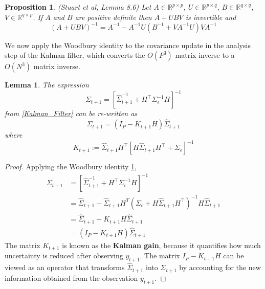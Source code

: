 \documentclass[12pt]{article}
\newcommand{\R}{\mathbb{R}}
\newtheorem{prop}{Proposition}
\newtheorem{lemma}{Lemma}
\begin{document}
\begin{prop} (Stuart et al, Lemma 8.6) \label{Woodbury}
Let $A \in \R^{p \times p}$, $U \in \R^{p \times q}$, $B \in \R^{q \times q}$, $V \in \R^{q \times p}$. If $A$ and $B$ are positive definite then $A + UBV$ is invertible 
and 
\[(A + UBV)^{-1} = A^{-1} - A^{-1} U\left(B^{-1} + VA^{-1}U\right)VA^{-1}\]
\end{prop}

We now apply the Woodbury identity to the covariance update in the analysis step of the Kalman filter, which converts the $O(P^3)$ matrix inverse to a $O(N^3)$ 
matrix inverse. 

\begin{lemma} 
The expression 
\[\Sigma_{t + 1} = \left[\hat{\Sigma}^{-1}_{t + 1} + H^\top \Sigma_{\epsilon}^{-1} H \right]^{-1}\]
from \ref{Kalman_Filter} can be re-written as 
\[\Sigma_{t + 1} = \left(I_P - K_{t+1}H \right)\hat{\Sigma}_{t+1}\]
where 
\[K_{t+1} := \hat{\Sigma}_{t+1} H^{\top} \left[H\hat{\Sigma}_{t+1} H^\top + \Sigma_{\epsilon} \right]^{-1} \]
\end{lemma}

\begin{proof}
Applying the Woodbury identity \ref{Woodbury}, 
\begin{align*}
\Sigma_{t + 1} &= \left[\hat{\Sigma}^{-1}_{t + 1} + H^\top \Sigma_{\epsilon}^{-1} H \right]^{-1} \\
		       &= \hat{\Sigma}_{t + 1} - \hat{\Sigma}_{t + 1} H^T \left(\Sigma_{\epsilon} + H\hat{\Sigma}_{t + 1}H^\top \right)^{-1} H \hat{\Sigma}_{t + 1} \\
		       &= \hat{\Sigma}_{t + 1} - K_{t+1} H \hat{\Sigma}_{t + 1} \\
		       &= \left(I_P - K_{t+1}H \right)\hat{\Sigma}_{t+1}
\end{align*}
The matrix $K_{t + 1}$ is known as the \textbf{Kalman gain}, because it quantifies how much uncertainty is reduced after observing $y_{t+1}$. The matrix 
 $I_P - K_{t+1}H$ can be viewed as an operator that transforms $\hat{\Sigma}_{t+1}$ into $\Sigma_{t + 1}$ by accounting for the new information obtained 
 from the observation $y_{t+1}$. 


\end{proof}
\end{document}
